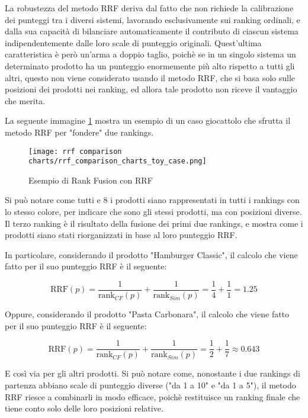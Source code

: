 La robustezza del metodo RRF deriva dal fatto che non richiede la calibrazione dei punteggi tra i diversi sistemi, lavorando esclusivamente sui ranking ordinali, e dalla sua capacità di bilanciare automaticamente il contributo di ciascun sistema indipendentemente dalle loro scale di punteggio originali. Quest'ultima caratteristica è però un'arma a doppio taglio, poichè se in un singolo sistema un determinato prodotto ha un punteggio enormemente più alto rispetto a tutti gli altri, questo non viene considerato usando il metodo RRF, che si basa solo sulle posizioni dei prodotti nei ranking, ed allora tale prodotto non riceve il vantaggio che merita.

La seguente immagine \ref{fig:rank-fusion-toy-case} mostra un esempio di un caso giocattolo che sfrutta il metodo RRF per "fondere" due rankings.

\begin{figure}[h]
    \centering
    \texttt{[image: rrf comparison charts/rrf\_comparison\_charts\_toy\_case.png]}
    \caption{Esempio di Rank Fusion con RRF}
    \label{fig:rank-fusion-toy-case}
\end{figure}

Si può notare come tutti e 8 i prodotti siano rappresentati in tutti i rankings con lo stesso colore, per indicare che sono gli stessi prodotti, ma con posizioni diverse.
Il terzo ranking è il risultato della fusione dei primi due rankings, e mostra come i prodotti siano stati riorganizzati in base al loro punteggio RRF.

In particolare, considerando il prodotto "Hamburger Classic", il calcolo che viene fatto per il suo punteggio RRF è il seguente:

\begin{equation}
\text{RRF}(p) = \frac{1}{\text{rank}_{CF}(p)} + \frac{1}{\text{rank}_{Sim}(p)} = \frac{1}{4} + \frac{1}{1} = 1.25
\end{equation}

Oppure, considerando il prodotto "Pasta Carbonara", il calcolo che viene fatto per il suo punteggio RRF è il seguente:

\begin{equation}
\text{RRF}(p) = \frac{1}{\text{rank}_{CF}(p)} + \frac{1}{\text{rank}_{Sim}(p)} = \frac{1}{2} + \frac{1}{7} \approx 0.643
\end{equation}

E così via per gli altri prodotti. Si può notare come, nonostante i due rankings di partenza abbiano scale di punteggio diverse ("da 1 a 10" e "da 1 a 5"), il metodo RRF riesce a combinarli in modo efficace, poichè restituisce un ranking finale che tiene conto solo delle loro posizioni relative.

